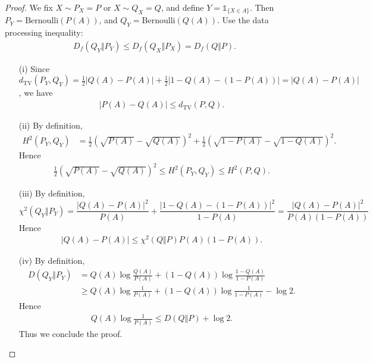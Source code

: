 \documentclass{article}
\numberwithin{equation}{section}
\theoremstyle{plain}
\theoremstyle{definition}
\begin{document}
\begin{proof}
We fix $X\sim P_X=P$ or $X\sim Q_X=Q$, and define $Y=\mathds{1}_{\{X\in A\}}$. Then $P_Y=\mathrm{Bernoulli}(P(A))$, and $Q_Y=\mathrm{Bernoulli}(Q(A))$. Use the data processing inequality:
\begin{align*}
	D_f(Q_Y\Vert P_Y)\leq D_f(Q_X\Vert P_X)=D_f(Q\Vert P).
\end{align*}
\begin{itemize}
\item[(i)] Since $d_\mathrm{TV}(P_Y,Q_Y)=\frac{1}{2}\vert Q(A)-P(A)\vert+\frac{1}{2}\vert 1-Q(A)-(1-P(A))\vert=\vert Q(A)-P(A)\vert$, we have
\begin{align*}
	\vert P(A)-Q(A)\vert\leq d_\mathrm{TV}(P,Q).
\end{align*}
\item[(ii)] By definition,
\begin{align*}
	H^2(P_Y,Q_Y)&=\frac{1}{2}\left(\sqrt{P(A)}-\sqrt{Q(A)}\right)^2+\frac{1}{2}\left(\sqrt{1-P(A)}-\sqrt{1-Q(A)}\right)^2.
\end{align*}
Hence
\begin{align*}
	\frac{1}{2}\left(\sqrt{P(A)}-\sqrt{Q(A)}\right)^2\leq H^2(P_Y,Q_Y)\leq H^2(P,Q).
\end{align*}
\item[(iii)] By definition, $$\chi^2(Q_Y\Vert P_Y)=\frac{\vert Q(A)-P(A)\vert^2}{P(A)}+\frac{\vert 1-Q(A)-(1-P(A))\vert^2}{1-P(A)}=\frac{\vert Q(A)-P(A)\vert^2}{P(A)(1-P(A))}$$
Hence
\begin{align*}
	\vert Q(A)-P(A)\vert\leq\chi^2(Q\Vert P)P(A)(1-P(A)).
\end{align*}
\item[(iv)] By definition,
\begin{align*}
	D(Q_Y\Vert P_Y)&=Q(A)\log\frac{Q(A)}{P(A)}+(1-Q(A))\log\frac{1-Q(A)}{1-P(A)}\\
	&\geq Q(A)\log\frac{1}{P(A)}+(1-Q(A))\log\frac{1}{1-P(A)}-\log 2.
\end{align*}
Hence
\begin{align*}
	Q(A)\log\frac{1}{P(A)}\leq D(Q\Vert P)+\log 2.
\end{align*}
Thus we conclude the proof.
\end{itemize}
\end{proof}
\end{document}
